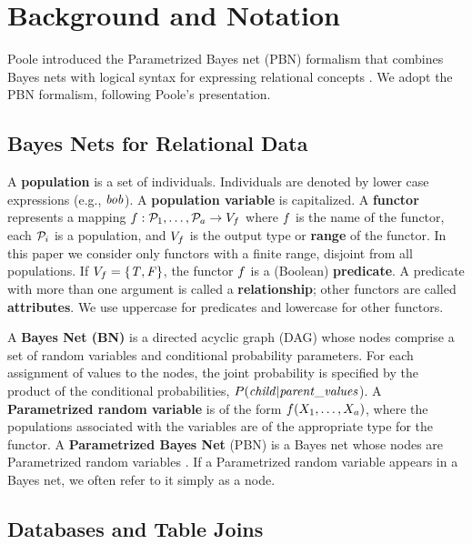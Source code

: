 \documentclass[runningheads,a4paper]{llncs}
\begin{document}
\section{Background and Notation} 
Poole introduced the Parametrized Bayes net (PBN) formalism that combines Bayes nets with logical syntax for expressing relational concepts \cite{Poole2003}. We adopt the PBN formalism, following Poole's presentation.

\subsection{Bayes Nets for Relational Data}
A \textbf{population} is a set of individuals. Individuals are denoted by lower case expressions (e.g., $\it{bob}$). A \textbf{population variable} is capitalized. A \textbf{functor} represents a mapping
$
f: \mathcal{P}_{1},\ldots,\mathcal{P}_{a} \rightarrow V_{f}
$
where $f$ is the name of the functor, each $\mathcal{P}_{i}$ is a population, and $V_{f}$ is the output type or \textbf{range} of the functor. In this paper we consider only functors with a finite range, disjoint from all populations.  If $V_{f} = \{\mathit{T},\mathit{F}\}$, the functor $f$ is a (Boolean) \textbf{predicate}. A predicate with more than one argument is called a \textbf{relationship}; other functors are called \textbf{attributes}. We use uppercase for predicates and lowercase for other functors.

A {\bf Bayes Net (BN)} is a directed acyclic graph (DAG) whose nodes comprise a set of random variables and conditional probability parameters.
For each assignment of values to the nodes, the joint probability 
is specified by the product of the conditional probabilities, $P(\it{child}|\it{parent\_values}$).
A \textbf{Parametrized random variable} is of the form $f(X_{1},\ldots,X_{a})$, where the populations associated with the variables are of the appropriate type for the functor. A \textbf{Parametrized Bayes Net} (PBN) is a Bayes net whose nodes are Parametrized random variables \cite{Poole2003}. If a Parametrized random variable appears in a Bayes net, we often refer to it simply as a node. 

\subsection{Databases and Table Joins}
 
\end{document}
